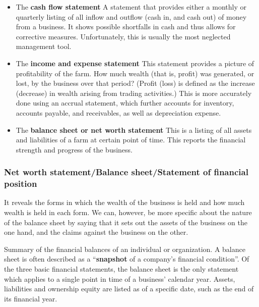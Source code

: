 \documentclass[11pt,]{book}
\theoremstyle{definition}
\theoremstyle{definition}
\theoremstyle{definition}
\theoremstyle{remark}
\begin{document}
\begin{itemize}
\item
  The \textbf{cash flow statement} \newline A statement that provides
  either a monthly or quarterly listing of all inflow and outflow (cash
  in, and cash out) of money from a business. It shows possible
  shortfalls in cash and thus allows for corrective measures.
  Unfortunately, this is usually the most neglected management tool.
\item
  The \textbf{income and expense statement} \newline This statement
  provides a picture of profitability of the farm. How much wealth (that
  is, profit) was generated, or lost, by the business over that period?
  (Profit (loss) is defined as the increase (decrease) in wealth arising
  from trading activities.) \newline This is more accurately done using
  an accrual statement, which further accounts for inventory, accounts
  payable, and receivables, as well as depreciation expense.
\item
  The \textbf{balance sheet or net worth statement} \newline This is a
  listing of all assets and liabilities of a farm at certain point of
  time. This reports the financial strength and progress of the
  business.
\end{itemize}

\subsubsection{Net worth statement/Balance sheet/Statement of financial
position}\label{net-worth-statementbalance-sheetstatement-of-financial-position}

It reveals the forms in which the wealth of the business is held and how
much wealth is held in each form. We can, however, be more specific
about the nature of the balance sheet by saying that it sets out the
assets of the business on the one hand, and the claims against the
business on the other.

Summary of the financial balances of an individual or organization. A
balance sheet is often described as a ``\textbf{snapshot} of a company's
financial condition''. Of the three basic financial statements, the
balance sheet is the only statement which applies to a single point in
time of a business' calendar year. Assets, liabilities and ownership
equity are listed as of a specific date, such as the end of its
financial year.
\end{document}
